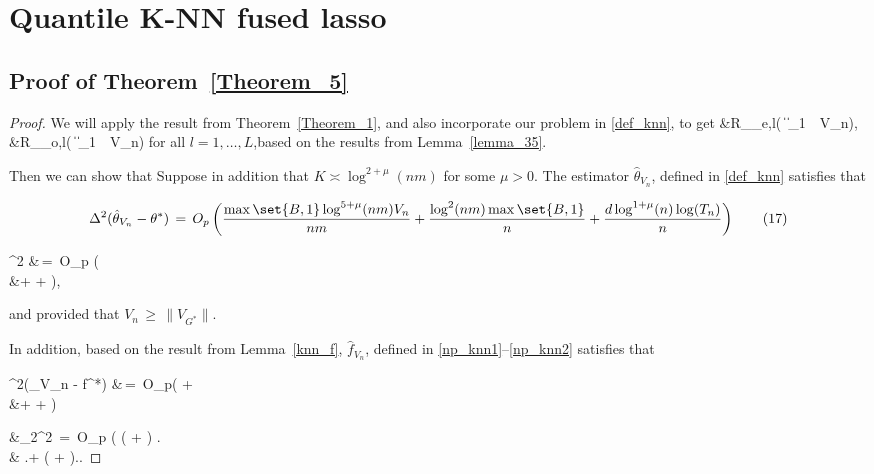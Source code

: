 \documentclass[twoside,11pt]{article}
\begin{document}
\section{Quantile K-NN fused lasso}
\subsection{Proof of  Theorem~\ref{Theorem_5}}
\begin{proof}
   We will apply the result from Theorem~\ref{Theorem_1}, and also incorporate our problem in \ref{def_knn}, to get 
\bea 
&R_{_{e,l}}\left( \| \theta\|_1 \,\leq\, V_n\cap {}\right), \quad \\  &R_{_{o,l}}\left( \| \theta\|_1 \,\leq\, V_n\cap {}\right) 
\bea for all $l = 1, \dots, L$,based on the results from Lemma~\ref{lemma_35}. 

Then we can show that 
Suppose in addition that \( K \asymp \log^{2+\mu}(nm) \) for some \( \mu > 0 \). The estimator \( \hat{\theta}_{V_n} \), defined in \eqref{def_knn} satisfies that

\begin{equation}
\Delta^2(\hat{\theta}_{V_n} - \theta^*) \,=\, O_p\left(\frac{ \max\set{B,1} \log^{5+\mu}(nm)V_n}{nm} + \frac{\log^2(nm)\max\set{B,1}}{n} + \frac{d \log^{1+\mu}(n) \log(T_n)}{n}\right) \tag{17}
\end{equation}




\bea
\label{knn_loss_1}
^2 &\,=\, O_p \bigg( \\
&\qquad\qquad +  + \bigg),
\bea  


and provided that \( V_n \,\geq\, \|V_{G^*}\| \). 


In addition, based on the result from Lemma~\ref{knn_f}, \( \hat{f}_{V_n} \), defined in \eqref{np_knn1}--\eqref{np_knn2} satisfies that

\bea
\Delta^2(_{V_n} - f^*)  &\,=\, O_p\bigg( +  \\
&\qquad\qquad +  +  \bigg)
\bea

\bea 
&_2^2 \,=\, O_p \biggl(  \max{} \biggl(   +   \biggr) \biggr. \\ & \quad \biggl.+ \max{}\cdot \left( + \right).\biggr.
\bea   
\end{proof}
\end{document}
